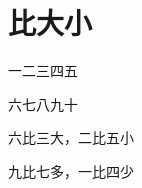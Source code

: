 \documentclass[12pt,UTF-8,openany]{ctexbook}
\begin{document}
\hanzibox{}\hanzibox{}\hanzibox{}\hanzibox{}\hspace{1em}\hanzibox{}\hanzibox{}\hanzibox{}\hanzibox{}

\hanzibox{}\hanzibox{}\hanzibox{}\hanzibox{}\hspace{1em}\hanzibox{}\hanzibox{}\hanzibox{}\hanzibox{}

\hanzibox{}\hanzibox{}\hanzibox{}\hanzibox{}\hspace{1em}\hanzibox{}\hanzibox{}\hanzibox{}\hanzibox{}






\chapter{比大小}

\begin{large}
    
    一二三四五
    
    六七八九十
    
    六比三大，二比五小
    
    九比七多，一比四少
    
\end{large}


\clearpage

\begin{center}
    
    
    
\end{center}


\hanzibox{}\hanzibox{}\hanzibox{}\hanzibox{}\hspace{1em}\hanzibox{}\hanzibox{}\hanzibox{}\hanzibox{}

\hanzibox{}\hanzibox{}\hanzibox{}\hanzibox{}\hspace{1em}\hanzibox{}\hanzibox{}\hanzibox{}\hanzibox{}

\hanzibox{}\hanzibox{}\hanzibox{}\hanzibox{}\hspace{1em}\hanzibox{}\hanzibox{}\hanzibox{}\hanzibox{}

\hanzibox{}\hanzibox{}\hanzibox{}\hanzibox{}\hspace{1em}\hanzibox{}\hanzibox{}\hanzibox{}\hanzibox{}
\end{document}

